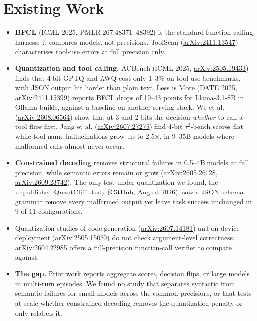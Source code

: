 \documentclass[12pt,a4paper]{article}
\begin{document}
\section*{Existing Work}

\begin{itemize}
  \item \textbf{BFCL} (ICML 2025, PMLR 267:48371--48392) is the standard function-calling harness;
        it compares models, not precisions. ToolScan
        (\href{https://arxiv.org/abs/2411.13547}{arXiv:2411.13547}) characterises tool-use errors at
        full precision only.
  \item \textbf{Quantization and tool calling.} ACBench (ICML 2025,
        \href{https://arxiv.org/abs/2505.19433}{arXiv:2505.19433}) finds that 4-bit GPTQ and AWQ cost
        only 1--3\% on tool-use benchmarks, with JSON output hit harder than plain text. Less is More
        (DATE 2025, \href{https://arxiv.org/abs/2411.15399}{arXiv:2411.15399}) reports BFCL drops of
        19--43 points for Llama-3.1-8B in Ollama builds, against a baseline on another serving stack. Wu et al. (\href{https://arxiv.org/abs/2608.06564}{arXiv:2608.06564})
        show that at 3 and 2 bits the decision \emph{whether} to call a tool flips first. Jang et al.
        (\href{https://arxiv.org/abs/2607.27275}{arXiv:2607.27275}) find 4-bit $\tau^2$-bench scores
        flat while tool-name hallucinations grow up to 2.5$\times$, in 9--35B models where malformed
        calls almost never occur.
  \item \textbf{Constrained decoding} removes structural failures in 0.5--4B models at full precision,
        while semantic errors remain or grow
        (\href{https://arxiv.org/abs/2605.26128}{arXiv:2605.26128},
        \href{https://arxiv.org/abs/2609.23742}{arXiv:2609.23742}). The only test under quantization
        we found, the unpublished QuantCliff study (GitHub, August 2026), saw a JSON-schema grammar
        remove every malformed output yet leave task success unchanged in 9 of 11 configurations.
  \item Quantization studies of code generation
        (\href{https://arxiv.org/abs/2607.14181}{arXiv:2607.14181}) and on-device deployment
        (\href{https://arxiv.org/abs/2505.15030}{arXiv:2505.15030}) do not check argument-level
        correctness; \href{https://arxiv.org/abs/2604.22985}{arXiv:2604.22985} offers a
        full-precision function-call verifier to compare against.
  \item \textbf{The gap.} Prior work reports aggregate scores, decision flips, or large models in
        multi-turn episodes. We found no study that separates syntactic from semantic failures for
        small models across the common precisions, or that tests at scale whether constrained
        decoding removes the quantization penalty or only relabels it.
\end{itemize}
\end{document}
